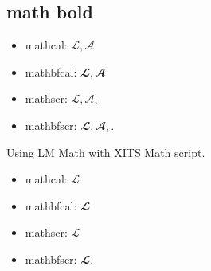 \documentclass[french, english]{llncs}
\begin{document}
\subsection{math bold}
\begin{itemize}
	\item mathcal: $\mathcal{L}, \mathcal{A}$
	\item mathbfcal: $\mathbfcal{L}, \mathbfcal{A}$ 
	\item mathscr: $\mathscr{L}, \mathscr{A}, $
	\item mathbfscr: $\mathbfscr{L}, \mathbfscr{A}, $.
\end{itemize}

Using LM Math with XITS Math script.
\begin{itemize}
	\item mathcal: $\mathcal{L}$
	\item mathbfcal: $\mathbfcal{L}$ 
	\item mathscr: $\mathscr{L}$
	\item mathbfscr: $\mathbfscr{L}$.
\end{itemize}
\end{document}
